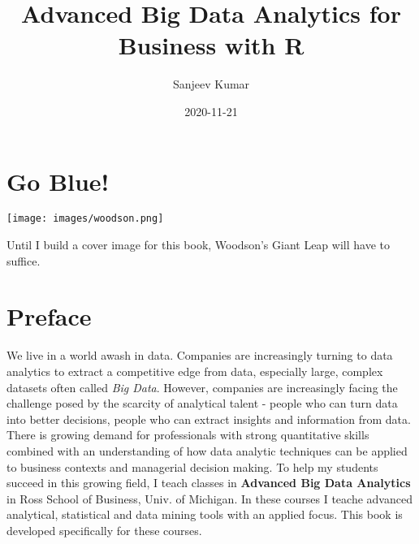 \documentclass[
]{krantz}
\title{Advanced Big Data Analytics for Business with R}
\author{Sanjeev Kumar}
\date{2020-11-21}
\renewenvironment{quote}{\begin{VF}}{\end{VF}}
\begin{document}
\maketitle


\thispagestyle{empty}

\begin{center}

\par{}

\end{center}

\setlength{\abovedisplayskip}{-5pt}
\setlength{\abovedisplayshortskip}{-5pt}

{
\hypersetup{linkcolor=}
\setcounter{tocdepth}{2}
\tableofcontents
}
\listoftables
\listoffigures
\hypertarget{go-blue}{%
\chapter*{Go Blue!}\label{go-blue}}


\texttt{[image: images/woodson.png]}

\begin{quote}
Until I build a cover image for this book, Woodson's Giant Leap will have to suffice.
\end{quote}

\hypertarget{preface}{%
\chapter*{Preface}\label{preface}}


We live in a world awash in data. Companies are increasingly turning to data analytics to
extract a competitive edge from data, especially large, complex datasets often called \emph{Big
Data}. However, companies are increasingly facing the challenge posed by the scarcity of
analytical talent - people who can turn data into better decisions, people who can extract
insights and information from data. There is growing demand for professionals with strong
quantitative skills combined with an understanding of how data analytic techniques can be
applied to business contexts and managerial decision making. To help my students succeed in
this growing field, I teach classes in \textbf{Advanced Big Data Analytics} in Ross School of Business, Univ. of Michigan. In these courses I teache advanced analytical, statistical and data mining tools with an applied focus. This book is developed specifically for these courses.
\end{document}
